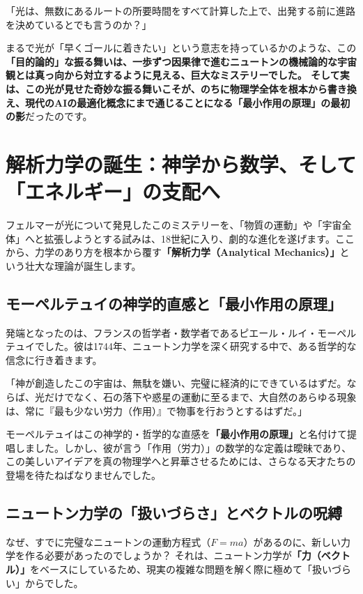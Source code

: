 「光は、無数にあるルートの所要時間をすべて計算した上で、出発する前に進路を決めているとでも言うのか？」

まるで光が「早くゴールに着きたい」という意志を持っているかのような、この\textbf{「目的論的」な振る舞いは、一歩ずつ因果律で進むニュートンの機械論的な宇宙観とは真っ向から対立するように見える、巨大なミステリーでした。 そして実は、この光が見せた奇妙な振る舞いこそが、のちに物理学全体を根本から書き換え、現代のAIの最適化概念にまで通じることになる「最小作用の原理」の最初の影}だったのです。

\section{解析力学の誕生：神学から数学、そして「エネルギー」の支配へ}

フェルマーが光について発見したこのミステリーを、「物質の運動」や「宇宙全体」へと拡張しようとする試みは、18世紀に入り、劇的な進化を遂げます。ここから、力学のあり方を根本から覆す\textbf{「解析力学（Analytical Mechanics）」}という壮大な理論が誕生します。

\subsection{モーペルテュイの神学的直感と「最小作用の原理」}

発端となったのは、フランスの哲学者・数学者であるピエール・ルイ・モーペルテュイでした。彼は1744年、ニュートン力学を深く研究する中で、ある哲学的な信念に行き着きます。

「神が創造したこの宇宙は、無駄を嫌い、完璧に経済的にできているはずだ。ならば、光だけでなく、石の落下や惑星の運動に至るまで、大自然のあらゆる現象は、常に『最も少ない労力（作用）』で物事を行おうとするはずだ。」

モーペルテュイはこの神学的・哲学的な直感を\textbf{「最小作用の原理」}と名付けて提唱しました。しかし、彼が言う「作用（労力）」の数学的な定義は曖昧であり、この美しいアイデアを真の物理学へと昇華させるためには、さらなる天才たちの登場を待たねばなりませんでした。

\subsection{ニュートン力学の「扱いづらさ」とベクトルの呪縛}

なぜ、すでに完璧なニュートンの運動方程式（\(F=ma\)）があるのに、新しい力学を作る必要があったのでしょうか？ それは、ニュートン力学が\textbf{「力（ベクトル）」}をベースにしているため、現実の複雑な問題を解く際に極めて「扱いづらい」からでした。

